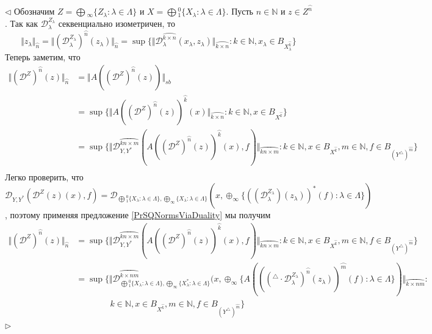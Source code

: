 \documentclass[12pt]{article}
\newenvironment{proof}{\par $\triangleleft$}{$\triangleright$}
\begin{document}
\begin{proof} Обозначим $Z=\bigoplus{}_\infty\{Z_\lambda:\lambda\in\Lambda\}$ и $X=\bigoplus{}_1^0\{X_\lambda:\lambda\in\Lambda\}$. Пусть $n\in\mathbb{N}$ и $z\in Z^{\wideparen{n}}$. Так как $\mathcal{D}_\lambda^{Z_\lambda}$ секвенциально изометричен, то
$$
\Vert z_\lambda\Vert_{\wideparen{n}}
=\Vert (\mathcal{D}_\lambda^{Z_\lambda})^{\wideparen{n}}(z_\lambda)\Vert_{\wideparen{n}}
=\sup\{\Vert \mathcal{D}_\lambda^{\wideparen{k\times n}}(x_\lambda,z_\lambda)\Vert_{\wideparen{k\times n}}:k\in\mathbb{N},x_\lambda\in B_{X_\lambda^{\wideparen{k}}}\}
$$
Теперь заметим, что
$$
\begin{aligned}
\Vert(\mathcal{D}^Z)^{\wideparen{n}}(z)\Vert_{\wideparen{n}}
&=\Vert A((\mathcal{D}^Z)^{\wideparen{n}}(z))\Vert_{sb}\\
&=\sup\{\Vert A((\mathcal{D}^Z)^{\wideparen{n}}(z))^{\wideparen{k}}(x)\Vert_{\wideparen{k\times n}}:k\in\mathbb{N},x\in B_{X^{\wideparen{k}}}\}\\
&=\sup\{\Vert \mathcal{D}_{Y,Y^*}^{\wideparen{kn\times m}}(A((\mathcal{D}^Z)^{\wideparen{n}}(z))^{\wideparen{k}}(x),f)\Vert_{\wideparen{kn\times m}}:k\in\mathbb{N},x\in B_{X^{\wideparen{k}}},m\in\mathbb{N},f\in B_{(Y^\triangle)^{\wideparen{m}}}\}\\
\end{aligned}
$$
Легко проверить, что $\mathcal{D}_{Y,Y^*}(\mathcal{D}^Z(z)(x),f)=\mathcal{D}_{\bigoplus{}_1^0\{X_\lambda:\lambda\in\Lambda\},\bigoplus_\infty\{X_\lambda:\lambda\in\Lambda\}}(x,\oplus_\infty\{((\mathcal{D}_\lambda^{Z_\lambda})(z_\lambda))^*(f):\lambda\in\Lambda\})$, поэтому применяя предложение \ref{PrSQNormsViaDuality} мы получим
$$
\begin{aligned}
\Vert(\mathcal{D}^Z)^{\wideparen{n}}(z)\Vert_{\wideparen{n}}
&=\sup\{\Vert \mathcal{D}_{Y,Y^*}^{\wideparen{kn\times m}}(A((\mathcal{D}^Z)^{\wideparen{n}}(z))^{\wideparen{k}}(x),f)\Vert_{\wideparen{kn\times m}}:k\in\mathbb{N},x\in B_{X^{\wideparen{k}}},m\in\mathbb{N},f\in B_{(Y^\triangle)^{\wideparen{m}}}\}\\
&=\sup\{\Vert \mathcal{D}_{\bigoplus{}_1^0\{X_\lambda:\lambda\in\Lambda\},\bigoplus_\infty\{X_\lambda^*:\lambda\in\Lambda\}}^{\wideparen{k\times nm}}(x,\oplus_\infty\{A((({}^\triangle\cdot\mathcal{D}_\lambda^{Z_\lambda})^{\wideparen{n}}(z_\lambda))^{\wideparen{m}}(f):\lambda\in\Lambda\})\Vert_{\wideparen{k\times nm}}: \\
&\qquad\qquad k\in\mathbb{N},x\in B_{X^{\wideparen{k}}},m\in\mathbb{N},f\in B_{(Y^\triangle)^{\wideparen{m}}}\}\\

\end{aligned}$$
\end{proof}
\end{document}
